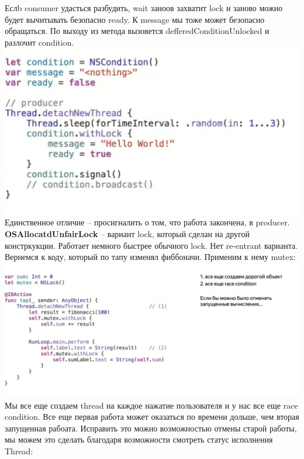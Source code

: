 \documentclass{article}
\begin{document}
    \newline
    Еслb consumer удасться разбудить, wait заноов захватит lock и заново можно будет вычитывать безопасно ready. К message мы тоже может безопасно обращаться. По выходу из метода вызовется defferedConditionUnlocked и разлочит condition.
    \newline
    \includegraphics[scale = 0.5]{pic/Снимок экрана 2023-08-04 в 12.46.11.png}
    \newline
    Единственное отличие -- просигналить о том, что работа закончена, в producer.
    \newline
    \textbf{OSAllocatdUnfairLock} -- вариант lock, который сделан на другой констркукции. Работает немного быстрее обычного lock. Нет re-entrant варианта.
    \newline
    Вернемся к коду, который по тапу изменял фиббоначи. Применим к нему mutex:
    \newline
    \includegraphics[scale = 0.2]{pic/Снимок экрана 2023-08-04 в 12.49.04.png}
    \newline
    Мы все еще создаем thread на каждое нажатие пользователя и у нас все еще race condition. Все еще первая работа может оказаться по времени дольше, чем вторая запущенная рабоата. Исправить это можно возможностью отмены старой работы, мы можем это сделать благодаря возможности смотреть статус исполнения Thread:
\end{document}
